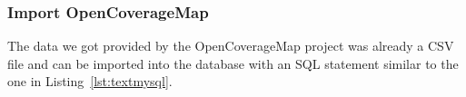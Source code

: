 \documentclass[master,english]{hgbthesis}
\begin{document}
\subsubsection{Import OpenCoverageMap}
The data we got provided by the OpenCoverageMap project was already a CSV file and can be imported into the database with an SQL statement similar to the one in Listing~\ref{lst:textmysql}.
\end{document}
